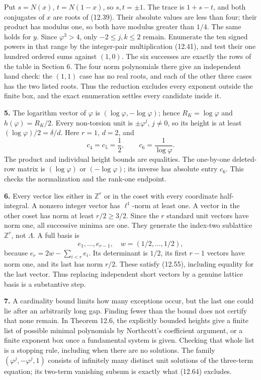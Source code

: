 \documentclass[
  11pt,
  a4paper,
]{article}
\newcounter{none} %
\begin{document}
Put \(s=N(x)\), \(t=N(1-x)\), so \(s,t=\pm1\). The trace is \(1+s-t\),
and both conjugates of \(x\) are roots of (12.39). Their absolute values
are less than four; their product has modulus one, so both have modulus
greater than \(1/4\). The same holds for \(y\). Since \(\varphi^3>4\),
only \(-2\le j,k\le2\) remain. Enumerate the ten signed powers in that
range by the integer-pair multiplication (12.41), and test their one
hundred ordered sums against \((1,0)\). The six successes are exactly
the rows of the table in Section 6. The four norm polynomials there give
an independent hand check: the \((1,1)\) case has no real roots, and
each of the other three cases has the two listed roots. Thus the
reduction excludes every exponent outside the finite box, and the exact
enumeration settles every candidate inside it.

\textbf{5.} The logarithm vector of \(\varphi\) is
\((\log\varphi,-\log\varphi)\); hence \(R_K=\log\varphi\) and
\(h(\varphi)=R_K/2\). Every non-torsion unit is \(\pm\varphi^j\),
\(j\ne0\), so its height is at least \((\log\varphi)/2=\delta/d\). Here
\(r=1\), \(d=2\), and \[
c_4=c_5=\frac12,\qquad c_6=\frac1{\log\varphi}.
\] The product and individual height bounds are equalities. The
one-by-one deleted-row matrix is \((\log\varphi)\) or
\((-\log\varphi)\); its inverse has absolute entry \(c_6\). This checks
the normalization and the rank-one endpoint.

\textbf{6.} Every vector lies either in \(\mathbb Z^r\) or in the coset
with every coordinate half-integral. A nonzero integer vector has
\(\ell^1\)-norm at least one. A vector in the other coset has norm at
least \(r/2\ge3/2\). Since the \(r\) standard unit vectors have norm
one, all successive minima are one. They generate the index-two
sublattice \(\mathbb Z^r\), not \(\Lambda\). A full basis is \[
e_1,\ldots,e_{r-1},\quad w=(1/2,\ldots,1/2),
\] because \(e_r=2w-\sum_{i<r}e_i\). Its determinant is \(1/2\), its
first \(r-1\) vectors have norm one, and its last has norm \(r/2\).
These satisfy (12.55), including equality for the last vector. Thus
replacing independent short vectors by a genuine lattice basis is a
substantive step.

\textbf{7.} A cardinality bound limits how many exceptions occur, but
the last one could lie after an arbitrarily long gap. Finding fewer than
the bound does not certify that none remain. In Theorem 12.6, the
explicitly bounded heights give a finite list of possible minimal
polynomials by Northcott's coefficient argument, or a finite exponent
box once a fundamental system is given. Checking that whole list is a
stopping rule, including when there are no solutions. The family
\((\varphi^j,-\varphi^j,1)\) consists of infinitely many distinct unit
solutions of the three-term equation; its two-term vanishing subsum is
exactly what (12.64) excludes.
\end{document}
